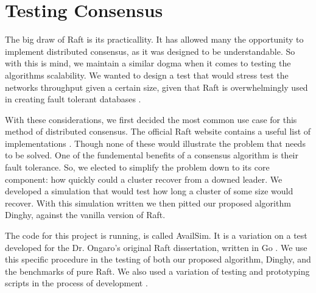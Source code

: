 \section{Testing Consensus}

	The big draw of Raft is its practicallity. It has allowed many the opportunity to implement distributed consensus, as it was designed to be understandable. So with this is mind, we maintain a similar dogma when it comes to testing the algorithms scalability. We wanted to design a test that would stress test the networks throughput given a certain size, given that Raft is overwhelmingly used in creating fault tolerant databases \cite{etcd, CockroachDB, TiKV, RethinkDB}.

	With these considerations, we first decided the most common use case for this method of distributed consensus. The official Raft website contains a useful list of implementations \cite{RaftSite}. Though none of these would illustrate the problem that needs to be solved. One of the fundemental benefits of a consensus algorithm is their fault tolerance. So, we elected to simplify the problem down to its core component: how quickly could a cluster recover from a downed leader. We developed a simulation that would test how long a cluster of some size would recover. With this simulation written we then pitted our proposed algorithm Dinghy, against the vanilla version of Raft.

	The code for this project is running, is called AvailSim. It is a variation on a test developed for the Dr. Ongaro's original Raft dissertation, written in Go \cite{AvailSim}. We use this specific procedure in the testing of both our proposed algorithm, Dinghy, and the benchmarks of pure Raft. We also used a variation of testing and prototyping scripts in the process of development \cite{Dinghy}.